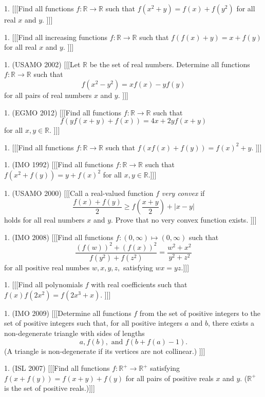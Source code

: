 1. [[[Find all functions $f : \mathbb{R} \to \mathbb{R}$ such that $f(x^2 + y) = f(x) + f(y^2)$ for all real $x$ and $y$. ]]]
  
1. [[[Find all increasing functions $f : \mathbb{R} \to \mathbb{R}$ such that $f(f(x) + y) = x + f(y)$ for all real $x$ and $y$. ]]]
  
1. (USAMO 2002) [[[Let $\mathbb{R}$ be the set of real numbers. Determine all functions $f : \mathbb{R} \to \mathbb{R}$ such that
  \[ f(x^2 - y^2) = xf(x) - yf(y) \]
  for all pairs of real numbers $x$ and $y$. ]]]
  
1. (EGMO 2012) [[[Find all functions $f : \mathbb{R} \to \mathbb{R}$ such that \[ f(yf(x+y) + f(x)) = 4x + 2y f(x+y) \] for all $x, y \in \mathbb{R}$. ]]]
  
1. [[[Find all functions $f : \mathbb{R} \to \mathbb{R}$ such that $f(xf(x) + f(y)) = f(x)^2 + y$. ]]]
  
1. (IMO 1992) [[[Find all functions $f : \mathbb{R} \to \mathbb{R}$ such that $f(x^2 + f(y)) = y + f(x)^2$ for all $x,y \in \mathbb{R}$.]]]
  
1. (USAMO 2000) [[[Call a real-valued function $f$ \emph{very convex} if 
  \[ \frac{f(x) + f(y)}{2} \geq f \left( \frac{x+y}{2} \right) + |x - y| \]
  holds for all real numbers $x$ and $y$. Prove that no very convex function exists. ]]]
    
1. (IMO 2008) [[[Find all functions $ f: (0, \infty) \mapsto (0, \infty)$ such that
\[ \frac {\left( f(w) \right)^2 + \left( f(x) \right)^2}{f(y^2) + f(z^2) } = \frac {w^2 + x^2}{y^2 + z^2} \]
for all positive real numbes $ w,x,y,z,$ satisfying $ wx = yz.$]]]

1. [[[Find all polynomials $f$ with real coefficients such that $f(x) f(2x^2) = f(2x^3 + x)$. ]]]
  
1. (IMO 2009) [[[Determine all functions $ f$ from the set of positive integers to the set of positive integers such that, for all positive integers $ a$ and $ b$, there exists a non-degenerate triangle with sides of lengths 
  \[ a, f(b), \text{ and } f(b + f(a) - 1). \]
  (A triangle is non-degenerate if its vertices are not collinear.) ]]]
  
1. (ISL 2007) [[[Find all functions $f : \mathbb{R}^+ \to \mathbb{R}^+$ satisfying $f(x+f(y)) = f(x+y) + f(y)$ for all pairs of positive reals $x$ and $y$. ($\mathbb{R}^+$ is the set of positive reals.)]]]